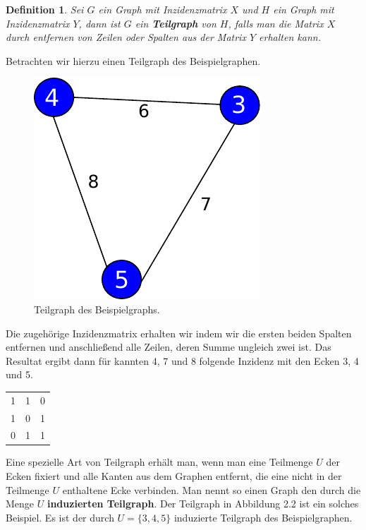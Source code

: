 \documentclass[11pt,a4paper,leqno]{report}
\newtheorem{definition}[theorem]{Definition}
\numberwithin{equation}{chapter}
\begin{document}
\begin{definition}
	Sei $G$ ein Graph mit Inzidenzmatrix $X$ und $H$ ein Graph mit Inzidenzmatrix $Y$, dann ist $G$ ein \textbf{Teilgraph} von $H$, falls man die Matrix $X$ durch entfernen von Zeilen oder Spalten aus der Matrix $Y$ erhalten kann.
\end{definition}
\noindent
Betrachten wir hierzu einen Teilgraph des Beispielgraphen.
\begin{figure}[H]
	\begin{center}
		\includegraphics[scale=0.4]{Abbildungen/graph_1_teil.pdf}
		\caption{Teilgraph des Beispielgraphs.}
	\end{center}
\end{figure}
\noindent
Die zugeh\"orige Inzidenzmatrix erhalten wir indem wir die ersten beiden Spalten entfernen und anschlie{\ss}end alle Zeilen, deren Summe ungleich zwei ist. 
\noindent
Das Resultat ergibt dann f\"ur kannten 4, 7 und 8 folgende Inzidenz mit den Ecken 3, 4 und 5.
	\begin{center}
	\begin{tabular}{c c c}
		1 & 1 & 0\\
		1 & 0 & 1\\
		0 & 1 & 1\\
	\end{tabular} 
\end{center}
Eine spezielle Art von Teilgraph erh\"alt man, wenn man eine Teilmenge $U$ der Ecken fixiert und alle Kanten aus dem Graphen entfernt, die eine nicht in der Teilmenge $U$ enthaltene Ecke verbinden. Man nennt so einen Graph den durch die Menge $U$ \textbf{induzierten Teilgraph}. Der Teilgraph in Abbildung 2.2 ist ein solches Beispiel. Es ist der durch $U =\{3, 4, 5\}$ induzierte Teilgraph des Beispielgraphen.
\end{document}
